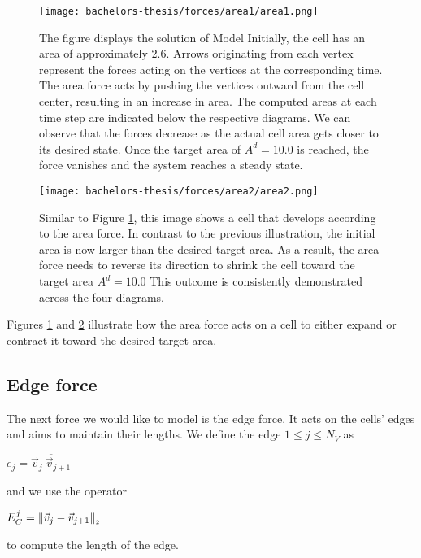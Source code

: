 \begin{figure}
	\begin{center}
		\texttt{[image: bachelors-thesis/forces/area1/area1.png]}
		\caption{The figure displays the solution of Model  
		Initially, the cell has an area of approximately $2.6$. 
		Arrows originating from each vertex represent the forces acting on the vertices at the corresponding time.
		The area force acts by pushing the vertices outward from the cell center, resulting in an increase in area.
		The computed areas at each time step are indicated below the respective diagrams.
		We can observe that the forces decrease as the actual cell area gets closer to its desired state. 
		Once the target area of $A^d = 10.0$ is reached, the force vanishes and the system reaches a steady state.
		}
		\label{fig:areaForce}
	\end{center}
\end{figure}

\begin{figure}
	\begin{center}
		\texttt{[image: bachelors-thesis/forces/area2/area2.png]}
		\caption{Similar to Figure \ref{fig:areaForce}, this image shows a cell that develops according to the area force. 
		In contrast to the previous illustration, the initial area is now larger than the desired target area.
		As a result, the area force needs to reverse its direction to shrink the cell toward the target area $A^d = 10.0$
		This outcome is consistently demonstrated across the four diagrams. }
		\label{fig:areaForce2}
	\end{center}
\end{figure}

Figures \ref{fig:areaForce} and \ref{fig:areaForce2} illustrate how the area force acts on a cell to either expand or contract it toward the desired target area.

    
\subsection{Edge force}
The next force we would like to model is the edge force. 
It acts on the cells' edges and aims to maintain their lengths.
We define the edge $1 \leq j \leq N_V$ as 
\begin{center}
	$
	e_j = \overline{\vec{v}_j \: \vec{v}_{j+1}}
	$
\end{center}
and we use the operator 
\begin{center}
	$
	E^j_C = \norm[\vec{v}_j - \vec{v}_{j+1}]
	$
\end{center}
to compute the length of the edge. 

